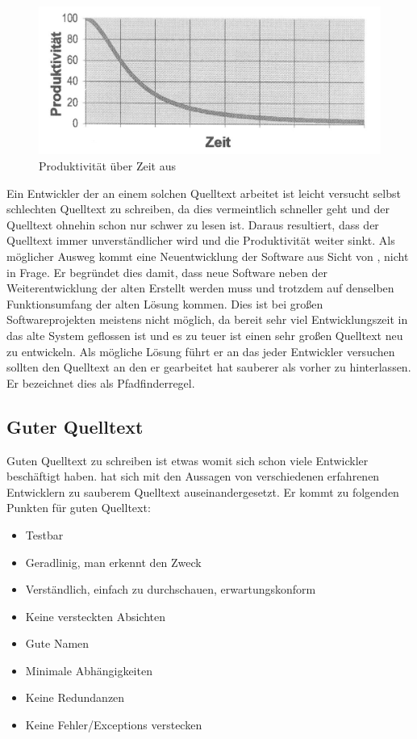 \begin{figure}[H]
	\centering
	\includegraphics[width=\textwidth]{poduktivitaet.jpg}
	\caption{Produktivität über Zeit aus \cite[S. 29]{Martin}}
	\label{grundlagen:produktivitaet}
\end{figure}

Ein Entwickler der an einem solchen Quelltext arbeitet ist leicht versucht selbst schlechten Quelltext zu schreiben, da dies vermeintlich schneller geht und der Quelltext ohnehin schon nur schwer zu lesen ist. Daraus resultiert, dass der Quelltext immer unverständlicher wird und die Produktivität weiter sinkt.
Als möglicher Ausweg kommt eine Neuentwicklung der Software aus Sicht von \cite[S. 29f.]{Martin}, nicht in Frage.
Er begründet dies damit, dass neue Software neben der Weiterentwicklung der alten Erstellt werden muss und trotzdem auf denselben Funktionsumfang der alten Lösung kommen. Dies ist bei großen Softwareprojekten meistens nicht möglich, da bereit sehr viel Entwicklungszeit in das alte System geflossen ist und es zu teuer ist einen sehr großen Quelltext neu zu entwickeln. Als mögliche Lösung führt er an das jeder Entwickler versuchen sollten den Quelltext an den er gearbeitet hat sauberer als vorher zu hinterlassen. Er bezeichnet dies als Pfadfinderregel.

\subsection{Guter Quelltext}

Guten Quelltext zu schreiben ist etwas womit sich schon viele Entwickler beschäftigt haben\cite{Martin, Green, Spinellis, reed}.
\cite[S. 32f.]{Martin} hat sich mit den Aussagen von verschiedenen erfahrenen Entwicklern zu sauberem Quelltext auseinandergesetzt.
Er kommt zu folgenden Punkten für guten Quelltext:

\begin{itemize}
\item Testbar
\item Geradlinig, man erkennt den Zweck
\item Verständlich, einfach zu durchschauen, erwartungskonform
\item Keine versteckten Absichten
\item Gute Namen
\item Minimale Abhängigkeiten
\item Keine Redundanzen
\item Keine Fehler/Exceptions verstecken
\end{itemize}

